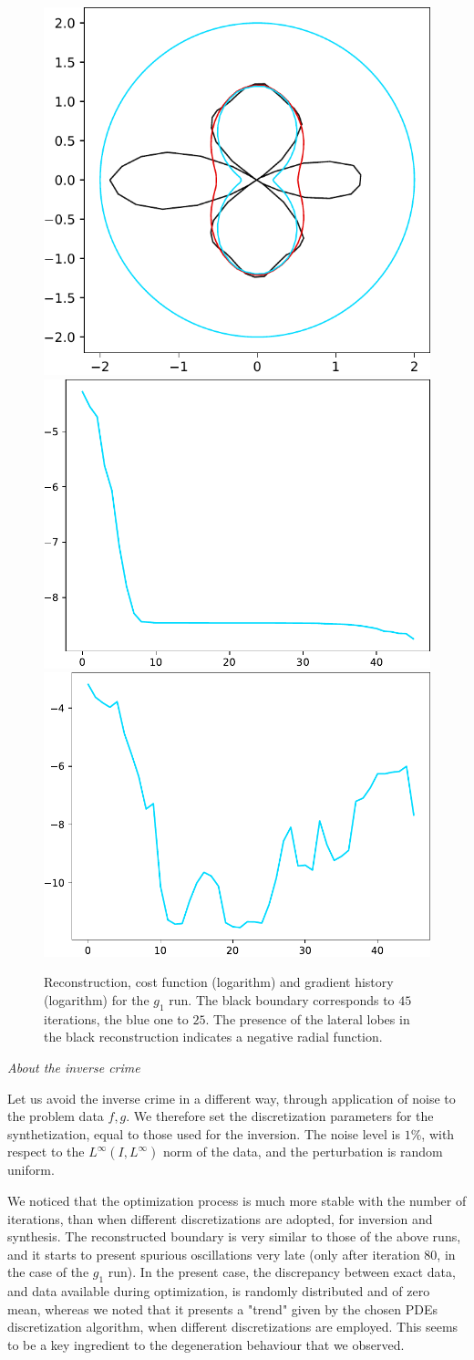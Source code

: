 \documentclass[english,a4paper,9pt,oneside]{scrbook}	%
\theoremstyle{break}
\theoremstyle{remark}
\begin{document}
\begin{figure}[H]
\centering
\includegraphics[height=0.25\columnwidth]{Images/comparison_25_45_euler.pdf}
\includegraphics[height=0.25\columnwidth]{Images/hourglass_constant_euler/cost_function_45.pdf}
\includegraphics[height=0.25\columnwidth]{Images/hourglass_constant_euler/gradient_infty_norm_45.pdf}
\caption{Reconstruction, cost function (logarithm) and gradient history (logarithm) for the $g_1$ run. The black boundary corresponds to $45$ iterations, the blue one to $25$. The presence of the lateral lobes in the black reconstruction indicates a negative radial function.}\label{fig:degenerate_euler}
\end{figure}

\textit{About the inverse crime}

Let us avoid the inverse crime in a different way, through application of noise to the problem data $f,g$. We therefore set the discretization parameters for the synthetization, equal to those used for the inversion. The noise level is $1$\%, with respect to the $L^\infty(I,L^\infty)$ norm of the data, and the perturbation is random uniform. 

We noticed that the optimization process is much more stable with the number of iterations, than when different discretizations are adopted, for inversion and synthesis. The reconstructed boundary is very similar to those of the above runs, and it starts to present spurious oscillations  very late (only after iteration $80$, in the case of the $g_1$ run). In the present case, the discrepancy between exact data, and data available during optimization, is randomly distributed and of zero mean, whereas we noted that it presents a "trend" given by the chosen PDEs discretization algorithm, when different discretizations are employed. This seems to be a key ingredient to the degeneration behaviour that we observed. 
\end{document}
